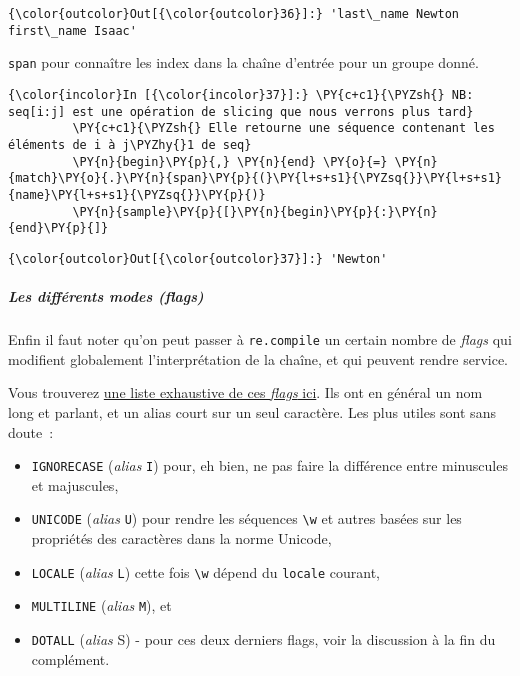 \begin{Verbatim}[commandchars=\\\{\},frame=single,framerule=0.3mm,rulecolor=\color{cellframecolor}]
{\color{outcolor}Out[{\color{outcolor}36}]:} 'last\_name Newton first\_name Isaac'
\end{Verbatim}
            
    \texttt{span} pour connaître les index dans la chaîne d'entrée pour un
groupe donné.

    \begin{Verbatim}[commandchars=\\\{\},frame=single,framerule=0.3mm,rulecolor=\color{cellframecolor}]
{\color{incolor}In [{\color{incolor}37}]:} \PY{c+c1}{\PYZsh{} NB: seq[i:j] est une opération de slicing que nous verrons plus tard}
         \PY{c+c1}{\PYZsh{} Elle retourne une séquence contenant les éléments de i à j\PYZhy{}1 de seq}
         \PY{n}{begin}\PY{p}{,} \PY{n}{end} \PY{o}{=} \PY{n}{match}\PY{o}{.}\PY{n}{span}\PY{p}{(}\PY{l+s+s1}{\PYZsq{}}\PY{l+s+s1}{name}\PY{l+s+s1}{\PYZsq{}}\PY{p}{)}
         \PY{n}{sample}\PY{p}{[}\PY{n}{begin}\PY{p}{:}\PY{n}{end}\PY{p}{]}
\end{Verbatim}


\begin{Verbatim}[commandchars=\\\{\},frame=single,framerule=0.3mm,rulecolor=\color{cellframecolor}]
{\color{outcolor}Out[{\color{outcolor}37}]:} 'Newton'
\end{Verbatim}
            
    \hypertarget{les-diffuxe9rents-modes-flags}{%
\subparagraph{\texorpdfstring{Les différents modes
(\emph{flags})}{Les différents modes (flags)}}\label{les-diffuxe9rents-modes-flags}}

    Enfin il faut noter qu'on peut passer à \texttt{re.compile} un certain
nombre de \emph{flags} qui modifient globalement l'interprétation de la
chaîne, et qui peuvent rendre service.

    Vous trouverez
\href{https://docs.python.org/3/library/re.html\#module-contents}{une
liste exhaustive de ces \emph{flags} ici}. Ils ont en général un nom
long et parlant, et un alias court sur un seul caractère. Les plus
utiles sont sans doute~:

\begin{itemize}
\tightlist
\item
  \texttt{IGNORECASE} (\emph{alias} \texttt{I}) pour, eh bien, ne pas
  faire la différence entre minuscules et majuscules,
\item
  \texttt{UNICODE} (\emph{alias} \texttt{U}) pour rendre les séquences
  \texttt{\textbackslash{}w} et autres basées sur les propriétés des
  caractères dans la norme Unicode,
\item
  \texttt{LOCALE} (\emph{alias} \texttt{L}) cette fois
  \texttt{\textbackslash{}w} dépend du \texttt{locale} courant,
\item
  \texttt{MULTILINE} (\emph{alias} \texttt{M}), et
\item
  \texttt{DOTALL} (\emph{alias} S) - pour ces deux derniers flags, voir
  la discussion à la fin du complément.
\end{itemize}

